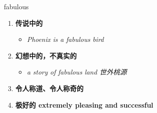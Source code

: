 
\begin{frame}
{\huge fabulous}
\begin{center}
\begin{enumerate}\Large
  \item \textbf{传说中的}
  \begin{itemize}
    \item \em{\Large{Phoenix is a fabulous bird}}
  \end{itemize}
  \item \textbf{幻想中的，不真实的}
  \begin{itemize}
    \item \em{\Large{a story of fabulous land 世外桃源}}
  \end{itemize}
  \item \textbf{令人称道、令人称奇的}
  \item \textbf{极好的 extremely pleasing and successful}
\end{enumerate}
\end{center}
\end{frame}
